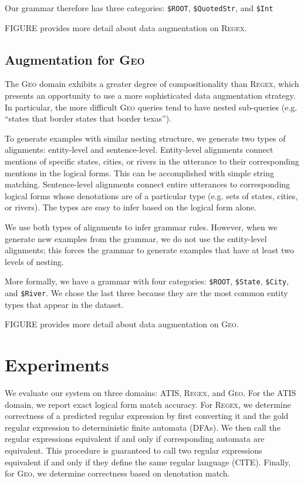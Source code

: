 \documentclass[11pt,letterpaper]{article}
\newcommand{\atis}{\textsc{ATIS}\xspace}
\newcommand{\regex}{\textsc{Regex}\xspace}
\newcommand{\geo}{\textsc{Geo}\xspace}
\begin{document}
Our grammar therefore has three categories: 
\texttt{\$ROOT}, \texttt{\$QuotedStr}, and \texttt{\$Int}

FIGURE provides more detail about data augmentation on \regex.

\subsection{Augmentation for \geo}
The \geo domain exhibits a greater degree of compositionality
than \regex, which presents an opportunity to use a more sophisticated
data augmentation strategy.
In particular, the more difficult \geo queries tend to have
nested sub-queries (e.g. ``states that border states that border texas'').

To generate examples with similar nesting structure,
we generate two types of alignments: entity-level and sentence-level.
Entity-level alignments connect mentions of specific states, cities, or rivers
in the utterance to their corresponding mentions in the logical forms.
This can be accomplished with simple string matching.
Sentence-level alignments connect entire utterances to 
corresponding logical forms whose denotations are of a particular 
type (e.g. sets of states, cities, or rivers).
The types are easy to infer based on the logical form alone.

We use both types of alignments to infer grammar rules.
However, when we generate new examples from the grammar,
we do not use the entity-level alignments;
this forces the grammar to generate examples that have 
at least two levels of nesting.

More formally, we have a grammar with four categories:
\texttt{\$ROOT}, \texttt{\$State}, \texttt{\$City}, and \texttt{\$River}.
We chose the last three because they are the most common entity types
that appear in the dataset.  

FIGURE provides more detail about data augmentation on \geo.

\section{Experiments}
We evaluate our system on three domains: \atis, \regex, and \geo.
For the \atis domain, we report exact logical form match accuracy.
For \regex, we determine correctness of a predicted regular expression
by first converting it and the gold regular expression to
deterministic finite automata (DFAs).  We then call the regular expressions
equivalent if and only if corresponding automata are equivalent.
This procedure is guaranteed to call two regular expressions equivalent
if and only if they define the same regular language (CITE).
Finally, for \geo, we determine correctness based on denotation match.
\end{document}
